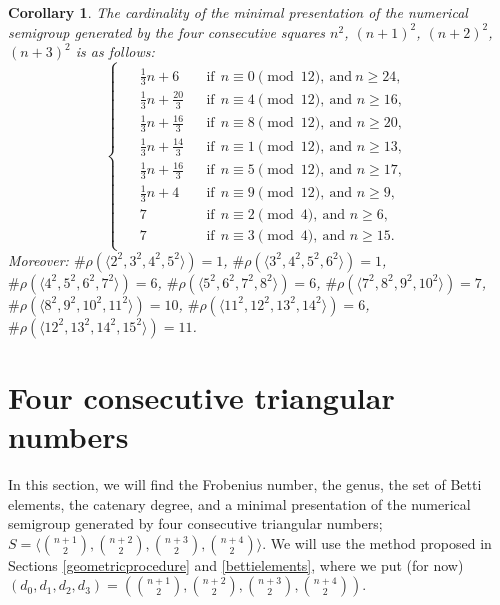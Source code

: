 \documentclass[12pt]{article}
\newtheorem{cor}[thm]{Corollary}
\theoremstyle{remark}
\begin{document}
\begin{cor}\label{corbettisquares}
    The cardinality of the minimal presentation of the numerical semigroup generated by the four consecutive squares $n^2$, $(n+1)^2$, $(n+2)^2$, $(n+3)^2$ is as follows:
$$
\begin{cases}
\begin{aligned}
&\frac{1}{3}n+6
    &&\text{if} \ \ n \equiv 0 \pmod{12},\ \text{and} \ n \ge 24,\\
&\frac{1}{3}n+\frac{20}{3}
    &&\text{if} \ \ n \equiv 4 \pmod{12},\ \text{and } n \ge 16,\\
&\frac{1}{3}n + \frac{16}{3}
    &&\text{if} \ \ n \equiv 8 \pmod{12},\ \text{and } n \ge 20,\\
&\frac{1}{3}n + \frac{14}{3}
    &&\text{if} \ \ n \equiv 1 \pmod{12},\ \text{and } n \ge 13,\\
&\frac{1}{3}n + \frac{16}{3}
    &&\text{if} \ \ n \equiv 5 \pmod{12},\ \text{and } n \ge 17,\\
&\frac{1}{3}n + 4
    &&\text{if} \ \ n \equiv 9 \pmod{12},\ \text{and } n \ge 9,\\
&7
    &&\text{if} \ \ n \equiv 2 \pmod{4},\ \text{and } n \ge 6, \\
&7
    &&\text{if} \ \ n \equiv 3 \pmod{4},\ \text{and } n \ge 15.
\end{aligned}
\end{cases}
    $$
Moreover:
$\# \rho(\langle 2^2,3^2,4^2,5^2 \rangle) = 1$,
$\# \rho(\langle 3^2,4^2,5^2,6^2 \rangle) = 1$,
$\# \rho(\langle 4^2,5^2,6^2,7^2 \rangle) = 6$, 
$\# \rho(\langle 5^2,6^2,7^2,8^2 \rangle) = 6$,
$\# \rho(\langle 7^2,8^2,9^2,10^2 \rangle) = 7$,
$\# \rho(\langle 8^2,9^2,10^2,11^2 \rangle) = 10$, 
$\# \rho(\langle 11^2,12^2,13^2,14^2 \rangle) = 6$,\\
$\# \rho(\langle 12^2,13^2,14^2,15^2 \rangle) = 11$.
\end{cor}




\section{Four consecutive triangular numbers}\label{triangularnumbers}

In this section, we will find the Frobenius number, the genus, the set of Betti elements, the catenary degree, and a minimal presentation of the numerical semigroup generated by four consecutive triangular numbers; $S = \langle \binom{n+1}{2},\binom{n+2}{2}, \binom{n+3}{2}, \binom{n+4}{2} \rangle $. We will use the method proposed in Sections \ref{geometricprocedure} and \ref{bettielements}, where we put (for now) $(d_0,d_1,d_2,d_3) = \left(\binom{n+1}{2},\binom{n+2}{2}, \binom{n+3}{2}, \binom{n+4}{2} \right)$. 
\end{document}
